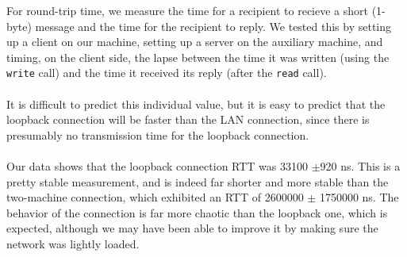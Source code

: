 \noindent For round-trip time, we measure the time for a recipient to recieve a short (1-byte) message and the time for the recipient to reply. We tested this by setting up a client on our machine, setting up a server on the auxiliary machine, and timing, on the client side, the lapse between the time it was written (using the {\tt write} call) and the time it received its reply (after the {\tt read} call).
\\
\\
It is difficult to predict this individual value, but it is easy to predict that the loopback connection will be faster than the LAN connection, since there is presumably no transmission time for the loopback connection.
\\
\\
Our data shows that the loopback connection RTT was 33100 $\pm$920 ns. This is a pretty stable measurement, and is indeed far shorter and more stable than the two-machine connection, which exhibited an RTT of 2600000 $\pm$ 1750000 ns. The behavior of the connection is far more chaotic than the loopback one, which is expected, although we may have been able to improve it by making sure the network was lightly loaded.